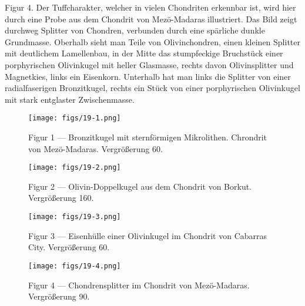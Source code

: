 \documentclass[a4paper, 12pt, oneside]{article}
\begin{document}
Figur 4. Der Tuffcharakter, welcher in vielen Chondriten erkennbar ist, wird hier durch eine Probe aus dem Chondrit von Mezö-Madaras illustriert. Das Bild zeigt durchweg Splitter von Chondren, verbunden durch eine spärliche dunkle Grundmasse. Oberhalb sieht man Teile von Olivinchondren, einen kleinen Splitter mit deutlichem Lamellenbau, in der Mitte das stumpfeckige Bruchstück einer porphyrischen Olivinkugel mit heller Glasmasse, rechts davon Olivinsplitter und Magnetkies, links ein Eisenkorn. Unterhalb hat man links die Splitter von einer radialfaserigen Bronzitkugel, rechts ein Stück von einer porphyrischen Olivinkugel mit stark entglaster Zwischenmasse.
\clearpage

\vspace*{\fill}
\begin{figure}[H]
\centering
\texttt{[image: figs/19-1.png]}
\caption{\small Figur 1 --- Bronzitkugel mit sternförmigen Mikrolithen. Chrondrit von Mezö-Madaras. Vergrößerung 60.}
\end{figure}
\vspace*{\fill}
\clearpage

\vspace*{\fill}
\begin{figure}[H]
\centering
\texttt{[image: figs/19-2.png]}
\caption{\small Figur 2 --- Olivin-Doppelkugel aus dem Chondrit von Borkut. Vergrößerung 160.}
\end{figure}
\vspace*{\fill}
\clearpage

\vspace*{\fill}
\begin{figure}[H]
\centering
\texttt{[image: figs/19-3.png]}
\caption{\small Figur 3 --- Eisenhülle einer Olivinkugel im Chondrit von Cabarras City. Vergrößerung 60.}
\end{figure}
\vspace*{\fill}
\clearpage

\vspace*{\fill}
\begin{figure}[H]
\centering
\texttt{[image: figs/19-4.png]}
\caption{\small Figur 4 --- Chondrensplitter im Chondrit von Mezö-Madaras. Vergrößerung 90.}
\end{figure}
\vspace*{\fill}
\clearpage
\end{document}
